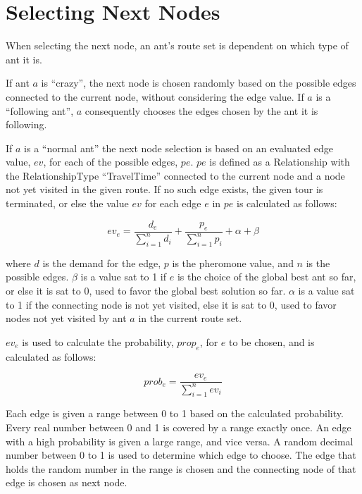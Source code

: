 \section{Selecting Next Nodes}
\label{sec:selectingNextNode}

When selecting the next node, an ant's route set is dependent on which type of ant it is. 

If ant $a$ is ``crazy'', the next node is chosen randomly based on the possible edges connected to the current node, without considering the edge value. If $a$ is a ``following ant'', $a$ consequently chooses the edges chosen by the ant it is following.  

If $a$ is a ``normal ant'' the next node selection is based on an evaluated edge value, $ev$, for each of the possible edges, $pe$. $pe$ is defined as a Relationship with the RelationshipType ``TravelTime'' connected to the current node and a node not yet visited in the given route. If no such edge exists, the given tour is terminated, or else the value $ev$ for each edge $e$ in $pe$ is calculated as follows: 

$$ev_e = \frac{d_e}{\sum\limits^{n}_{i=1}d_i} + \frac{p_e}{\sum\limits^{n}_{i=1}p_i} + \alpha + \beta$$

where $d$ is the demand for the edge, $p$ is the pheromone value, and $n$ is the possible edges. $\beta$ is a value sat to 1 if $e$ is the choice of the global best ant so far, or else it is sat to 0, used to favor the global best solution so far. %
$\alpha$ is a value sat to 1 if the connecting node is not yet visited, else it is sat to 0, used to favor nodes not yet visited by ant $a$ in the current route set.  

$ev_e$ is used to calculate the probability, $prop_e$, for $e$ to be chosen, and is calculated as follows:

$$prob_e = \frac{ev_e}{\sum\limits^{n}_{i=1}ev_i}$$

Each edge is given a range between 0 to 1 based on the calculated probability. Every real number between 0 and 1 is covered by a range exactly once. An edge with a high probability is given a large range, and vice versa. A random decimal number between 0 to 1 is used to determine which edge to choose. The edge that holds the random number in the range is chosen and the connecting node of that edge is chosen as next node. 

